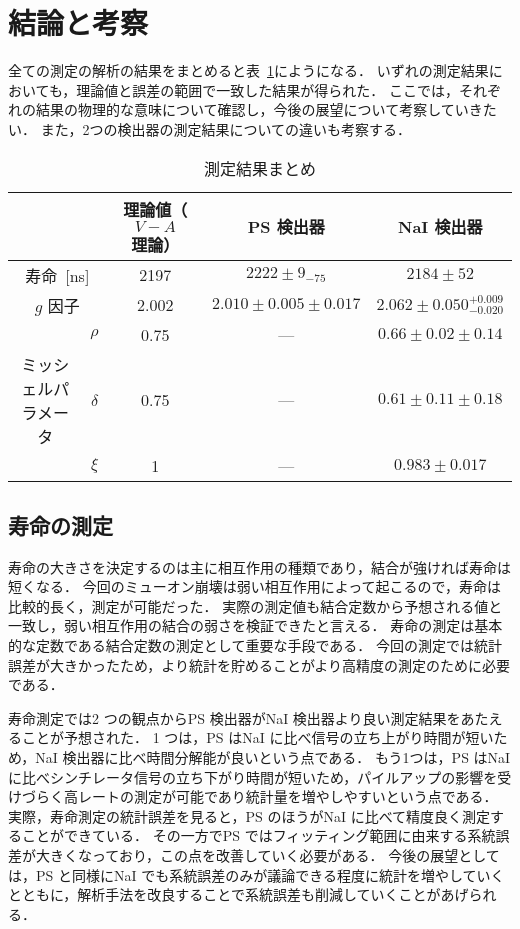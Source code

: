\section{結論と考察}
全ての測定の解析の結果をまとめると表~\ref{tab:result_conclusion}にようになる．
いずれの測定結果においても，理論値と誤差の範囲で一致した結果が得られた．
ここでは，それぞれの結果の物理的な意味について確認し，今後の展望について考察していきたい．
また，2つの検出器の測定結果についての違いも考察する．

\begin{table}[h]
\centering
\caption{測定結果まとめ}
\label{tab:result_conclusion}
\begin{tabular}{ccccc}\toprule
{} & {} & 理論値（$V-A$理論） & PS 検出器 & NaI 検出器\\ \midrule
\multicolumn{2}{c}{寿命~[ns]} &  2197 & $2222 \pm 9_{- 75}$ & $2184 \pm 52$\\
\multicolumn{2}{c}{$g$ 因子} & 2.002 & $2.010 \pm 0.005 \pm 0.017$ & $2.062 \pm 0.050^{+0.009}_{-0.020}$\\ %
{} & $\rho$ & 0.75 & --- & $0.66 \pm 0.02 \pm 0.14$\\
ミッシェルパラメータ & $\delta$ & 0.75 & --- & $0.61 \pm 0.11 \pm 0.18$\\
{} & $\xi$ & 1 & --- & $0.983 \pm 0.017$\\ \bottomrule
\end{tabular}
\end{table}%

\subsection{寿命の測定}
寿命の大きさを決定するのは主に相互作用の種類であり，結合が強ければ寿命は短くなる．
今回のミューオン崩壊は弱い相互作用によって起こるので，寿命は比較的長く，測定が可能だった．
実際の測定値も結合定数から予想される値と一致し，弱い相互作用の結合の弱さを検証できたと言える．
寿命の測定は基本的な定数である結合定数の測定として重要な手段である．
今回の測定では統計誤差が大きかったため，より統計を貯めることがより高精度の測定のために必要である．

寿命測定では2 つの観点からPS 検出器がNaI 検出器より良い測定結果をあたえることが予想された．
1 つは，PS はNaI に比べ信号の立ち上がり時間が短いため，NaI 検出器に比べ時間分解能が良いという点である．
もう1つは，PS はNaI に比べシンチレータ信号の立ち下がり時間が短いため，パイルアップの影響を受けづらく高レートの測定が可能であり統計量を増やしやすいという点である．
実際，寿命測定の統計誤差を見ると，PS のほうがNaI に比べて精度良く測定することができている．
その一方でPS ではフィッティング範囲に由来する系統誤差が大きくなっており，この点を改善していく必要がある．
今後の展望としては，PS と同様にNaI でも系統誤差のみが議論できる程度に統計を増やしていくとともに，解析手法を改良することで系統誤差も削減していくことがあげられる．%

